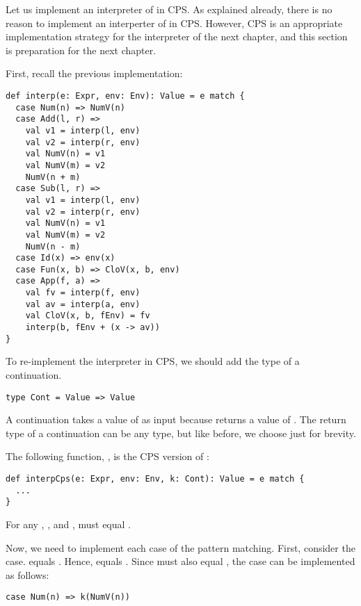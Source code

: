 Let us implement an interpreter of \lang in CPS. As explained already, there is
no reason to implement an interperter of \lang in CPS. However, CPS is an appropriate
implementation strategy for the interpreter of the next chapter, and this
section is preparation for the next chapter.

First, recall the previous implementation:

\begin{verbatim}
def interp(e: Expr, env: Env): Value = e match {
  case Num(n) => NumV(n)
  case Add(l, r) =>
    val v1 = interp(l, env)
    val v2 = interp(r, env)
    val NumV(n) = v1
    val NumV(m) = v2
    NumV(n + m)
  case Sub(l, r) =>
    val v1 = interp(l, env)
    val v2 = interp(r, env)
    val NumV(n) = v1
    val NumV(m) = v2
    NumV(n - m)
  case Id(x) => env(x)
  case Fun(x, b) => CloV(x, b, env)
  case App(f, a) =>
    val fv = interp(f, env)
    val av = interp(a, env)
    val CloV(x, b, fEnv) = fv
    interp(b, fEnv + (x -> av))
}
\end{verbatim}

To re-implement the interpreter in CPS, we should add the type of a
continuation.

\begin{verbatim}
type Cont = Value => Value
\end{verbatim}

A continuation takes a value of  as input because 
returns a value of . The return type of a continuation can be any
type, but like before, we choose  just for brevity.

The following function, , is the CPS version of :

\begin{verbatim}
def interpCps(e: Expr, env: Env, k: Cont): Value = e match {
  ...
}
\end{verbatim}

For any , , and ,  must equal
.

Now, we need to implement each case of the pattern matching. First, consider the
 case.  equals . Hence,
 equals . Since
 must also equal , the
 case can be implemented as follows:

\begin{verbatim}
case Num(n) => k(NumV(n))
\end{verbatim}

